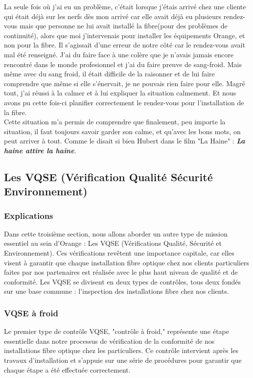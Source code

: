 \documentclass[12pt, a4paper]{article}
\begin{document}
La seule fois où j'ai eu un problème, c'était
lorsque j'étais arrivé chez une cliente qui était 
déjà sur les nerfs dès mon arrivé car elle avait
déjà eu plusieurs rendez-vous mais que personne 
ne lui avait installé la fibre(pour des problèmes
de continuité), alors que moi 
j'intervenais pour installer les équipements 
Orange, et non pour la fibre. Il s'agissait d'une erreur 
de notre côté car le rendez-vous avait mal 
été renseigné. J'ai du faire face à une colère 
que je n'avais jamais encore rencontré dans le monde 
profesionnel et j'ai du faire preuve de sang-froid. 
Mais même avec du sang froid, il était 
difficile de la raisonner et de lui faire comprendre 
que même si elle s'énervait, je ne pouvais rien faire
pour elle. Magré tout, j'ai réussi à la calmer et
à lui expliquer la situation calmement. Et nous 
avons pu cette fois-ci planifier correctement 
le rendez-vous pour l'installation de la fibre.\\

Cette situation m'a permis de comprendre que 
finalement, peu importe la situation, il faut
toujours savoir garder son calme, et qu'avec les 
bons mots, on peut arriver à tout. Comme le disait 
si bien Hubert dans le film 
"La Haine" : \textbf{\textit{La haine attire la haine}}.

\newpage
\subsection{Les VQSE (Vérification Qualité Sécurité Environnement)}
\subsubsection{Explications}
Dans cette troisième section, nous allons
aborder un autre type de mission essentiel
au sein d'Orange : Les VQSE (Vérifications
Qualité, Sécurité et Environnement). 
Ces vérifications revêtent une
importance capitale, car elles visent
à garantir que chaque installation
fibre optique chez nos clients
particuliers faites par nos partenaires
est réalisée avec le
plus haut niveau de qualité et de conformité.
Les VQSE se divisent en deux types de contrôles,
tous deux fondés sur une base commune :
l'inspection des installations
fibre chez nos clients.

\subsubsection{VQSE à froid}
Le premier type de contrôle VQSE,  "contrôle à froid,"
représente une étape essentielle dans notre
processus de vérification de la conformité de
nos installations fibre optique chez
les particuliers. Ce contrôle intervient
après les travaux d'installation et
s'appuie sur une série de procédures pour
garantir que chaque étape a été effectuée correctement.
\end{document}
